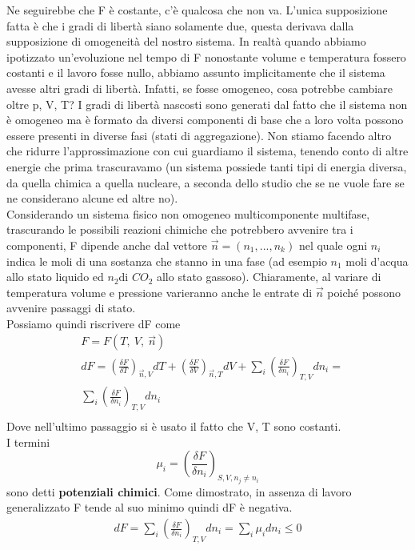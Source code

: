 \documentclass[10pt,a4paper]{article}
\begin{document}
Ne seguirebbe che F è costante, c'è qualcosa che non va. L'unica supposizione fatta è che i gradi di libertà siano solamente due, questa derivava dalla supposizione di omogeneità del nostro sistema. In realtà quando abbiamo ipotizzato un'evoluzione nel tempo di F nonostante volume e temperatura fossero costanti e il lavoro fosse nullo, abbiamo assunto implicitamente che il sistema avesse altri gradi di libertà. Infatti, se fosse omogeneo, cosa potrebbe cambiare oltre p, V, T? I gradi di libertà nascosti sono generati dal fatto che il sistema non è omogeneo ma è formato da diversi componenti di base che a loro volta possono essere presenti in diverse fasi (stati di aggregazione). Non stiamo facendo altro che ridurre l'approssimazione con cui guardiamo il sistema, tenendo conto di altre energie che prima trascuravamo (un sistema possiede tanti tipi di energia diversa, da quella chimica a quella nucleare, a seconda dello studio che se ne vuole fare se ne considerano alcune ed altre no).\\
Considerando un sistema fisico non omogeneo multicomponente multifase, trascurando le possibili reazioni chimiche che potrebbero avvenire tra i componenti, F dipende anche dal vettore $\vec{n}=(n_1,...,n_k)$ nel quale ogni \(n_i\) indica le moli di una sostanza che stanno in una fase (ad esempio \(n_1\) moli d'acqua allo stato liquido ed \(n_2\)di \(CO_2\) allo stato gassoso). Chiaramente, al variare di temperatura volume e pressione varieranno anche le entrate di $\vec{n}$ poiché possono avvenire passaggi di stato.\\
Possiamo quindi riscrivere dF come  
\begin{align*}
	&F = F(T,\ V,\ \vec{n})\\
	&dF = \left(\frac{\delta F}{\delta T}\right)_{\vec{n}, V} dT + \left(\frac{\delta F}{\delta V}\right)_{\vec{n}, T} dV+\sum_i \left(\frac{\delta F}{\delta n_i}\right)_{T,V} dn_i = \\
	&\sum_i \left(\frac{\delta F}{\delta n_i}\right)_{T,V} dn_i\\
\end{align*} 
Dove nell'ultimo passaggio si è usato il fatto che V, T sono costanti.\\
I termini
 \[\mu_i = \left(\frac{\delta F}{\delta n_i}\right)_{S,V,n_j\neq n_i}\] 
 sono detti \textbf{potenziali chimici}. Come dimostrato, in assenza di lavoro generalizzato F tende al suo minimo quindi dF è negativa. 
\begin{align*}
	dF = \sum_i \left(\frac{\delta F}{\delta n_i}\right)_{T,V} dn_i = \sum_i \mu_i dn_i \leq 0
\end{align*}
\end{document}

